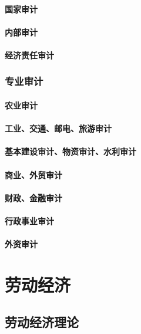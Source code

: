 \documentclass[UTF8]{../../RepresentationUniverse}
\begin{document}
    \subsubsection{国家审计}
    \subsubsection{内部审计}
    \subsubsection{经济责任审计}
\subsection{专业审计}
    \subsubsection{农业审计}
    \subsubsection{工业、交通、邮电、旅游审计}
    \subsubsection{基本建设审计、物资审计、水利审计}
    \subsubsection{商业、外贸审计}
    \subsubsection{财政、金融审计}
    \subsubsection{行政事业审计}
    \subsubsection{外资审计}






\chapter{劳动经济}
\section{劳动经济理论}
\end{document}
